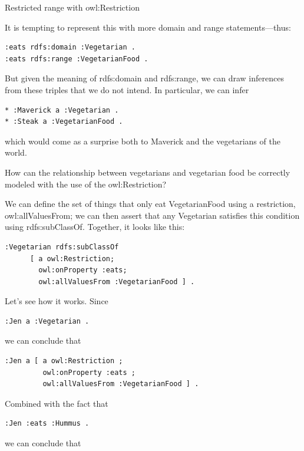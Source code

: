 \begin{challenge}{Restricted range with owl:Restriction}

It is tempting to represent this with more domain and range
statements---thus:

\begin{lstlisting}
:eats rdfs:domain :Vegetarian .
:eats rdfs:range :VegetarianFood .
\end{lstlisting}

But given the meaning of rdfs:domain and rdfs:range, we can draw
inferences from these triples that we do not intend. In particular, we
can infer

\begin{lstlisting}
* :Maverick a :Vegetarian .
* :Steak a :VegetarianFood .
\end{lstlisting}

which would come as a surprise both to Maverick and the vegetarians of
the world.

How can the relationship between vegetarians and vegetarian food be
correctly modeled with the use of the
owl:Restriction?

\solution

We can define the set of things that only eat VegetarianFood using a
restriction, owl:allValuesFrom; we can then assert that any Vegetarian
satisfies this condition using rdfs:subClassOf. Together, it looks like
this:

\begin{lstlisting}
:Vegetarian rdfs:subClassOf
      [ a owl:Restriction;
        owl:onProperty :eats;
        owl:allValuesFrom :VegetarianFood ] .
\end{lstlisting}

Let's see how it works. Since

\begin{lstlisting}
:Jen a :Vegetarian .
\end{lstlisting}

we can conclude that

\begin{lstlisting}
:Jen a [ a owl:Restriction ;
         owl:onProperty :eats ;
         owl:allValuesFrom :VegetarianFood ] .
\end{lstlisting}

Combined with the fact that

\begin{lstlisting}
:Jen :eats :Hummus .
\end{lstlisting}

we can conclude that


\end{challenge}
